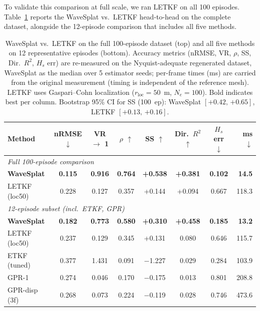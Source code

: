 To validate this comparison at full scale, we ran LETKF on all 100
episodes.  Table~\ref{tab:strong_baseline} reports the WaveSplat
vs.\ LETKF head-to-head on the complete dataset, alongside the
12-episode comparison that includes all five methods.

\begin{table}[t]
\centering
\caption{WaveSplat vs.\ LETKF on the full 100-episode dataset (top)
and all five methods on 12 representative episodes (bottom).
Accuracy metrics (nRMSE, VR, $\rho$, SS, Dir.\ $R^2$, $H_s$ err) are
re-measured on the Nyquist-adequate regenerated dataset, WaveSplat as
the median over 5 estimator seeds; per-frame times (ms) are carried from
the original measurement (timing is independent of the reference mesh).
LETKF uses Gaspari--Cohn localization ($r_{\text{loc}}=50$~m,
$N_e=100$).  Bold indicates best per column.
Bootstrap 95\% CI for SS (100~ep): WaveSplat $[{+0.42},\,{+0.65}]$,
LETKF $[{+0.13},\,{+0.16}]$.}
\label{tab:strong_baseline}
\begin{tabular}{lccccccr}
\toprule
Method & nRMSE $\downarrow$ & VR $\to$ 1 & $\rho$ $\uparrow$ &
SS $\uparrow$ & Dir.\ $R^2$ $\uparrow$ & $H_s$ err $\downarrow$ &
ms $\downarrow$ \\
\midrule
\multicolumn{8}{l}{\emph{Full 100-episode comparison}} \\
\textbf{WaveSplat} & \textbf{0.115} & \textbf{0.916} & \textbf{0.764} &
\textbf{+0.538} & \textbf{+0.381} & \textbf{0.102} & \textbf{14.5} \\
LETKF (loc50)      & 0.228 & 0.127 & 0.357 & +0.144 &
+0.094 & 0.667 & 118.3 \\
\midrule
\multicolumn{8}{l}{\emph{12-episode subset (incl.\ ETKF, GPR)}} \\
\textbf{WaveSplat} & \textbf{0.182} & \textbf{0.773} & \textbf{0.580} &
\textbf{+0.310} & \textbf{+0.458} & \textbf{0.185} & \textbf{13.2} \\
LETKF (loc50)      & 0.237 & 0.129 & 0.345 & +0.131 & 0.080 & 0.646 & 115.7 \\
ETKF (tuned)       & 0.377 & 1.431 & 0.091 & $-$1.227 & 0.029 & 0.284 & 103.9 \\
GPR-1              & 0.274 & 0.046 & 0.170 & $-$0.175 & 0.013 & 0.801 & 208.8 \\
GPR-disp (3f)      & 0.268 & 0.073 & 0.224 & $-$0.119 & 0.028 & 0.746 & 473.6 \\
\bottomrule
\end{tabular}
\end{table}

